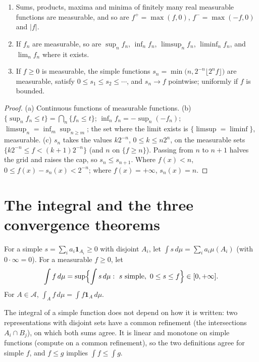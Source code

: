 \begin{proposition}\label{prop:measurablefns}
\begin{enumerate}[label=(\alph*)]
\item Sums, products, maxima and minima of finitely many real measurable functions are measurable, and so are $f^+=\max(f,0)$, $f^-=\max(-f,0)$ and $|f|$.
\item If $f_n$ are measurable, so are $\sup_nf_n$, $\inf_nf_n$, $\limsup_nf_n$, $\liminf_nf_n$, and $\lim_nf_n$ where it exists.
\item If $f\ge0$ is measurable, the simple functions $s_n=\min\bigl(n,2^{-n}\lfloor2^nf\rfloor\bigr)$ are measurable, satisfy $0\le s_1\le s_2\le\cdots$, and $s_n\to f$ pointwise; uniformly if $f$
is bounded.
\end{enumerate}
\end{proposition}
\begin{proof}
(a) Continuous functions of measurable functions. (b) $\{\sup_nf_n\le t\}=\bigcap_n\{f_n\le t\}$; $\inf_nf_n=-\sup_n(-f_n)$; $\limsup_n=\inf_m\sup_{n\ge m}$; the set where the limit exists is
$\{\limsup=\liminf\}$, measurable. (c) $s_n$ takes the values $k2^{-n}$, $0\le k\le n2^n$, on the measurable sets $\{k2^{-n}\le f<(k+1)2^{-n}\}$ (and $n$ on $\{f\ge n\}$). Passing from $n$ to $n+1$
halves the grid and raises the cap, so $s_n\le s_{n+1}$. Where $f(x)<n$, $0\le f(x)-s_n(x)<2^{-n}$; where $f(x)=+\infty$, $s_n(x)=n$.
\end{proof}

\section{The integral and the three convergence theorems}

\begin{definition}
For a simple $s=\sum_ia_i\mathbf 1_{A_i}\ge0$ with disjoint $A_i$, let $\int s\,d\mu=\sum_ia_i\mu(A_i)$ (with $0\cdot\infty=0$). For a measurable $f\ge0$, let
\[\int f\,d\mu=\sup\Bigl\{\int s\,d\mu:\ s\text{ simple},\ 0\le s\le f\Bigr\}\in[0,+\infty].\]
For $A\in\mathcal A$, $\int_Af\,d\mu=\int f\mathbf 1_A\,d\mu$.
\end{definition}

The integral of a simple function does not depend on how it is written: two representations with disjoint sets have a common refinement (the
intersections $A_i\cap B_j$), on which both sums agree. It is linear and monotone on simple functions (compute on a common refinement), so the two
definitions agree for simple $f$, and $f\le g$ implies $\int f\le\int g$.

